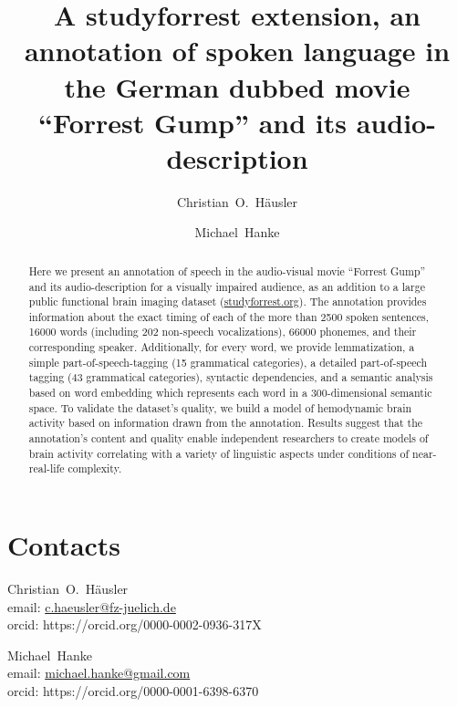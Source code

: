 \documentclass[10pt,a4paper,onecolumn]{article}
\begin{document}



\title{A studyforrest extension, an annotation of spoken language in the German dubbed movie ``Forrest Gump'' and its audio-description}

\author[1, 2]{Christian~O.~Häusler}
\author[1, 2]{Michael~Hanke}


\maketitle

\thispagestyle{fancy}

\begin{abstract}
Here we present an annotation of speech in the audio-visual movie
``Forrest Gump'' and its audio-description for a visually impaired audience,
as an addition to a large public functional brain imaging dataset
(\href{www.studyforrest.org}{studyforrest.org}).
The annotation provides information about the exact timing of each of the more
than 2500 spoken sentences, 16000 words (including 202 non-speech
vocalizations), 66000 phonemes, and their corresponding speaker.
Additionally, for every word, we provide lemmatization, a simple
part-of-speech-tagging (15 grammatical categories), a detailed part-of-speech
tagging (43 grammatical categories), syntactic dependencies, and a semantic
analysis based on word embedding which represents each word in a
300-dimensional semantic space.
To validate the dataset's quality, we build a model of hemodynamic brain
activity based on information drawn from the annotation.
Results suggest that the annotation's content and quality enable independent
researchers to create models of brain activity correlating with a
variety of linguistic aspects under conditions of near-real-life complexity.
\end{abstract}


\section*{Contacts}
\begin{description}
  \item{Christian~O.~Häusler} \\
    email: \href{mailto:c.haeusler@fz-juelich.de}{c.haeusler@fz-juelich.de} \\
    orcid: https://orcid.org/0000-0002-0936-317X
  \item{Michael~Hanke}\\
    email: \href{mailto:michael.hanke@gmail.com}{michael.hanke@gmail.com} \\
    orcid: https://orcid.org/0000-0001-6398-6370 \\
\end{description}
\end{document}
